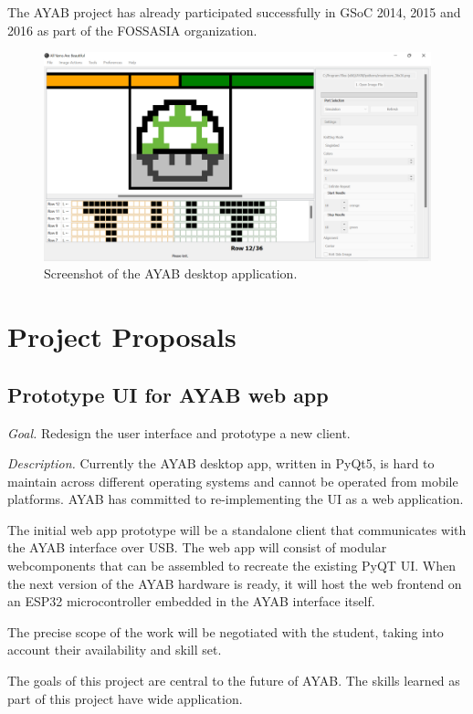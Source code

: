 \documentclass{article}
\begin{document}
The AYAB project has already participated successfully in GSoC 2014, 2015 and 2016 as part of the FOSSASIA organization.

\begin{figure}
    \centering
    \includegraphics[width=\textwidth]{ayab-app-screenshot.png}
    \caption{Screenshot of the AYAB desktop application.}
    \label{fig:1}
\end{figure}


\section{Project Proposals}

\subsection{Prototype UI for AYAB web app}

\textit{Goal.} Redesign the user interface and prototype a new client.

\textit{Description.} Currently the AYAB desktop app, written in PyQt5, is hard to maintain across different operating systems and cannot be operated from mobile platforms. AYAB has committed to re-implementing the UI as a web application.

The initial web app prototype will be a standalone client that communicates with the AYAB interface over USB. The web app will consist of modular webcomponents that can be assembled to recreate the existing PyQT UI. When the next version of the AYAB hardware is ready, it will host the web frontend on an ESP32 microcontroller embedded in the AYAB interface itself.

The precise scope of the work will be negotiated with the student, taking into account their availability and skill set.

The goals of this project are central to the future of AYAB. The skills learned as part of this project have wide application.
\end{document}
